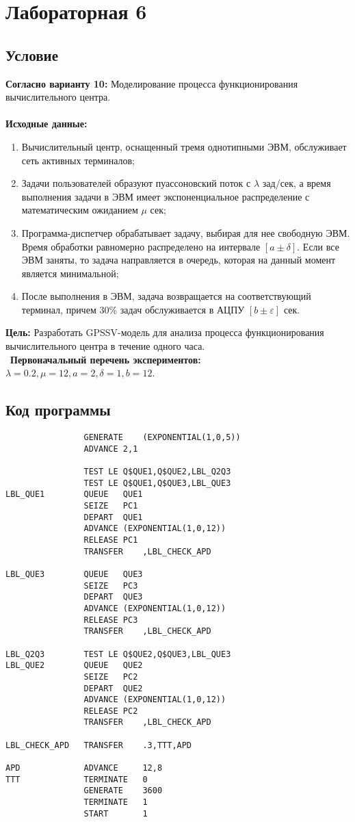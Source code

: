 \section{Лабораторная 6}

\subsection{Условие}

\textbf{Согласно варианту 10:}
Моделирование процесса функционирования вычислительного центра.\\
\\
\textbf{Исходные данные:}
\begin{enumerate}
	\item Вычислительный центр, оснащенный тремя однотипными ЭВМ, обслуживает сеть активных терминалов;
	\item Задачи пользователей образуют пуассоновский поток с $\lambda$ зад/сек, а время выполнения задачи в ЭВМ имеет экспоненциальное распределение с математическим ожиданием $\mu$ сек;
	\item Программа-диспетчер обрабатывает задачу, выбирая для нее свободную ЭВМ. Время обработки равномерно распределено на интервале $[a\pm\delta]$. Если все ЭВМ заняты, то задача направляется в очередь, которая на данный момент является минимальной;
	\item После выполнения в ЭВМ, задача возвращается на соответствующий терминал, причем 30\% задач обслуживается в АЦПУ $[b\pm\varepsilon]$ сек.
\end{enumerate}
\textbf{Цель:} Разработать GPSSV-модель для анализа процесса функционирования вычислительного центра в течение одного часа.\\
\
\textbf{Первоначальный перечень экспериментов:} $\lambda=0.2, \mu=12, a=2, \delta=1, b=12$.

\subsection{Код программы}

\begin{lstlisting}
				GENERATE	(EXPONENTIAL(1,0,5))
				ADVANCE	2,1

				TEST LE	Q$QUE1,Q$QUE2,LBL_Q2Q3
				TEST LE	Q$QUE1,Q$QUE3,LBL_QUE3
LBL_QUE1		QUEUE	QUE1
				SEIZE	PC1
				DEPART	QUE1
				ADVANCE	(EXPONENTIAL(1,0,12))
				RELEASE	PC1
				TRANSFER	,LBL_CHECK_APD

LBL_QUE3		QUEUE	QUE3
				SEIZE	PC3
				DEPART	QUE3
				ADVANCE	(EXPONENTIAL(1,0,12))
				RELEASE	PC3
				TRANSFER	,LBL_CHECK_APD

LBL_Q2Q3		TEST LE	Q$QUE2,Q$QUE3,LBL_QUE3
LBL_QUE2		QUEUE	QUE2
				SEIZE	PC2
				DEPART	QUE2
				ADVANCE	(EXPONENTIAL(1,0,12))
				RELEASE	PC2
				TRANSFER	,LBL_CHECK_APD

LBL_CHECK_APD	TRANSFER	.3,TTT,APD

APD				ADVANCE		12,8
TTT				TERMINATE	0
				GENERATE	3600
				TERMINATE	1
	    		START		1

\end{lstlisting}

